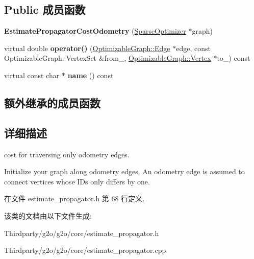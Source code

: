 \subsection*{Public 成员函数}
\begin{DoxyCompactItemize}
\item 
\hypertarget{classg2o_1_1EstimatePropagatorCostOdometry_a426a53e3cce07b71a129cc53754e9f1a}{{\bfseries Estimate\-Propagator\-Cost\-Odometry} (\hyperlink{classg2o_1_1SparseOptimizer}{Sparse\-Optimizer} $\ast$graph)}\label{classg2o_1_1EstimatePropagatorCostOdometry_a426a53e3cce07b71a129cc53754e9f1a}

\item 
\hypertarget{classg2o_1_1EstimatePropagatorCostOdometry_a5f479f6d87636d71913c2a390047ea71}{virtual double {\bfseries operator()} (\hyperlink{classg2o_1_1OptimizableGraph_1_1Edge}{Optimizable\-Graph\-::\-Edge} $\ast$edge, const Optimizable\-Graph\-::\-Vertex\-Set \&from\-\_\-, \hyperlink{classg2o_1_1OptimizableGraph_1_1Vertex}{Optimizable\-Graph\-::\-Vertex} $\ast$to\-\_\-) const }\label{classg2o_1_1EstimatePropagatorCostOdometry_a5f479f6d87636d71913c2a390047ea71}

\item 
\hypertarget{classg2o_1_1EstimatePropagatorCostOdometry_aca626795267c23c863940eddca62a029}{virtual const char $\ast$ {\bfseries name} () const }\label{classg2o_1_1EstimatePropagatorCostOdometry_aca626795267c23c863940eddca62a029}

\end{DoxyCompactItemize}
\subsection*{额外继承的成员函数}


\subsection{详细描述}
cost for traversing only odometry edges. 

Initialize your graph along odometry edges. An odometry edge is assumed to connect vertices whose I\-Ds only differs by one. 

在文件 estimate\-\_\-propagator.\-h 第 68 行定义.



该类的文档由以下文件生成\-:\begin{DoxyCompactItemize}
\item 
Thirdparty/g2o/g2o/core/estimate\-\_\-propagator.\-h\item 
Thirdparty/g2o/g2o/core/estimate\-\_\-propagator.\-cpp\end{DoxyCompactItemize}
